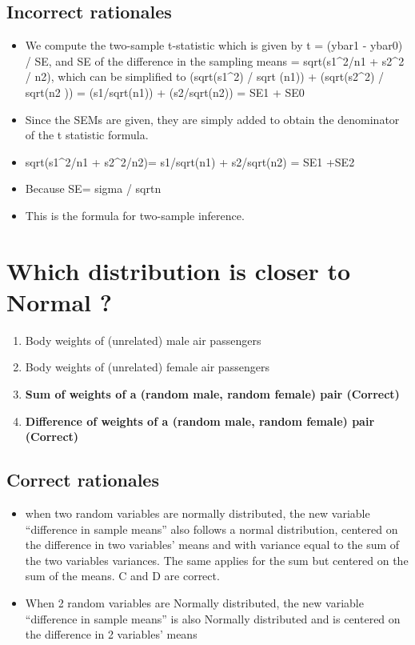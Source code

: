 \documentclass[letterpaper,9pt,twoside,printwatermark=false]{pinp}
\providecommand{\tightlist}{%
  \setlength{\itemsep}{0pt}\setlength{\parskip}{0pt}}
\begin{document}
\subsection{Incorrect rationales}\label{incorrect-rationales}

\begin{itemize}
\tightlist
\item
  We compute the two-sample t-statistic which is given by t = (ybar1 -
  ybar0) / SE, and SE of the difference in the sampling means =
  sqrt(s1\^{}2/n1 + s2\^{}2 / n2), which can be simplified to
  (sqrt(s1\^{}2) / sqrt (n1)) + (sqrt(s2\^{}2) / sqrt(n2 )) =
  (s1/sqrt(n1)) + (s2/sqrt(n2)) = SE1 + SE0
\item
  Since the SEMs are given, they are simply added to obtain the
  denominator of the t statistic formula.
\item
  sqrt(s1\^{}2/n1 + s2\^{}2/n2)= s1/sqrt(n1) + s2/sqrt(n2) = SE1 +SE2
\item
  Because SE= sigma / sqrtn
\item
  This is the formula for two-sample inference.
\end{itemize}

\section{Which distribution is closer to Normal
?}\label{which-distribution-is-closer-to-normal}

\begin{enumerate}
\def\labelenumi{\alph{enumi}.}
\tightlist
\item
  Body weights of (unrelated) male air passengers
\item
  Body weights of (unrelated) female air passengers
\item
  \textbf{Sum of weights of a (random male, random female) pair
  (Correct)}
\item
  \textbf{Difference of weights of a (random male, random female) pair
  (Correct)}
\end{enumerate}

\subsection{Correct rationales}\label{correct-rationales-1}

\begin{itemize}
\tightlist
\item
  when two random variables are normally distributed, the new variable
  ``difference in sample means'' also follows a normal distribution,
  centered on the difference in two variables' means and with variance
  equal to the sum of the two variables variances. The same applies for
  the sum but centered on the sum of the means. C and D are correct.
\item
  When 2 random variables are Normally distributed, the new variable
  ``difference in sample means'' is also Normally distributed and is
  centered on the difference in 2 variables' means
\end{itemize}
\end{document}
